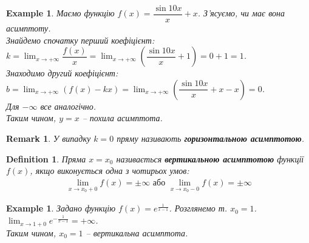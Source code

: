 \documentclass[a4paper, 14pt]{article}
\theoremstyle{theoremdd}
\theoremstyle{theoremdd}
\newtheorem{definition}[theorem]{Definition}
\theoremstyle{theoremdd}
\theoremstyle{theoremdd}
\newtheorem{example}[theorem]{Example}
\theoremstyle{theoremdd}
\theoremstyle{theoremdd}
\newtheorem{remark}[theorem]{Remark}
\theoremstyle{theoremdd}
\theoremstyle{theoremdd}
\begin{document}
\begin{example}
Маємо функцію $f(x) = \dfrac{\sin 10 x}{x} + x$. З'ясуємо, чи має вона асимптоту.\\
Знайдемо спочатку перший коефіцієнт:\\
$k = \displaystyle\lim_{x \to +\infty} \dfrac{f(x)}{x} = \lim_{x \to +\infty} \left( \dfrac{\sin 10 x}{x} + 1 \right) = 0 + 1 = 1$.\\
Знаходимо другий коефіцієнт:\\
$b = \displaystyle\lim_{x \to +\infty} (f(x) - kx) = \lim_{x \to +\infty} \left( \dfrac{\sin 10 x}{x} + x - x \right) = 0$.\\
\textit{Для $-\infty$ все аналогічно.}\\
Таким чином, $y = x$ -- похила асимптота.
\\ %
\end{example}

\begin{remark}
У випадку $k = 0$ пряму називають \textbf{горизонтальною асимптотою}.
\end{remark}

\begin{definition}
Пряма $x = x_0$ називається \textbf{вертикальною асимптотою} функції $f(x)$, якщо виконується одна з чотирьох умов:
\begin{align*}
\lim_{x \to x_0 + 0} f(x) = \pm \infty \text{ або } \lim_{x \to x_0 - 0} f(x) = \pm \infty
\end{align*}
\end{definition}

\begin{example}
Задано функцію $f(x) = e^{\frac{1}{x-1}}$. Розглянемо т. $x_0 = 1$.\\
$\displaystyle \lim_{x \to 1+0} e^{-\frac{1}{x-1}} = +\infty$.\\
Таким чином, $x_0 = 1$ -- вертикальна асимптота.
\\ %
\end{example}
\end{document}
